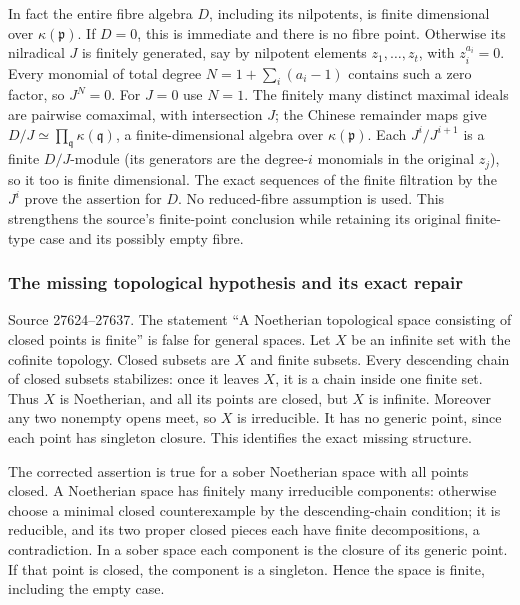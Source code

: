 In fact the entire fibre algebra \(D\), including its nilpotents, is finite dimensional over \(\kappa(\mathfrak p)\). If \(D=0\), this is immediate and there is no fibre point. Otherwise its nilradical \(J\) is finitely generated, say by nilpotent elements \(z_1,\ldots,z_t\), with \(z_i^{a_i}=0\). Every monomial of total degree \(N=1+\sum_i(a_i-1)\) contains such a zero factor, so \(J^N=0\). For \(J=0\) use \(N=1\). The finitely many distinct maximal ideals are pairwise comaximal, with intersection \(J\); the Chinese remainder maps give \(D/J\simeq\prod_{\mathfrak q}\kappa(\mathfrak q)\), a finite-dimensional algebra over \(\kappa(\mathfrak p)\). Each \(J^i/J^{i+1}\) is a finite \(D/J\)-module (its generators are the degree-\(i\) monomials in the original \(z_j\)), so it too is finite dimensional. The exact sequences of the finite filtration by the \(J^i\) prove the assertion for \(D\). No reduced-fibre assumption is used. This strengthens the source's finite-point conclusion while retaining its original finite-type case and its possibly empty fibre.

\subsubsection{The missing topological hypothesis and its exact repair}\label{the-missing-topological-hypothesis-and-its-exact-repair}

Source 27624--27637. The statement ``A Noetherian topological space consisting of closed points is finite'' is false for general spaces. Let \(X\) be an infinite set with the cofinite topology. Closed subsets are \(X\) and finite subsets. Every descending chain of closed subsets stabilizes: once it leaves \(X\), it is a chain inside one finite set. Thus \(X\) is Noetherian, and all its points are closed, but \(X\) is infinite. Moreover any two nonempty opens meet, so \(X\) is irreducible. It has no generic point, since each point has singleton closure. This identifies the exact missing structure.

The corrected assertion is true for a sober Noetherian space with all points closed. A Noetherian space has finitely many irreducible components: otherwise choose a minimal closed counterexample by the descending-chain condition; it is reducible, and its two proper closed pieces each have finite decompositions, a contradiction. In a sober space each component is the closure of its generic point. If that point is closed, the component is a singleton. Hence the space is finite, including the empty case.

